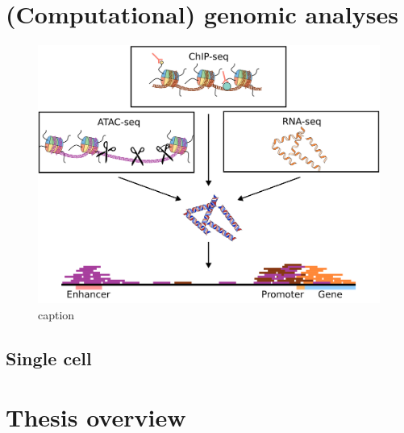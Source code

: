 \section{(Computational) genomic analyses}

\begin{figure}[H]
    \includegraphics[width=\linewidth]{ch1.Introduction/imgs/analysis.png}
    \caption{caption}
    \label{fig:analysis}
\end{figure}

\subsection{Single cell}

\section{Thesis overview}
